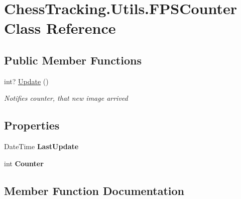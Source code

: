 \hypertarget{class_chess_tracking_1_1_utils_1_1_f_p_s_counter}{}\section{Chess\+Tracking.\+Utils.\+F\+P\+S\+Counter Class Reference}
\label{class_chess_tracking_1_1_utils_1_1_f_p_s_counter}
\subsection*{Public Member Functions}
\begin{DoxyCompactItemize}
\item 
int? \mbox{\hyperlink{class_chess_tracking_1_1_utils_1_1_f_p_s_counter_a8fcd8ace4e8f826f6b7ab54611618ce8}{Update}} ()
\begin{DoxyCompactList}\small\item\em Notifies counter, that new image arrived \end{DoxyCompactList}\end{DoxyCompactItemize}
\subsection*{Properties}
\begin{DoxyCompactItemize}
\item 
\mbox{\label{class_chess_tracking_1_1_utils_1_1_f_p_s_counter_a916eb84ecd60bc2ffd13f792f8f93418}} 
Date\+Time {\bfseries Last\+Update}
\item 
\mbox{\label{class_chess_tracking_1_1_utils_1_1_f_p_s_counter_ac636eb17a4982f8a367ba7af3259df1e}} 
int {\bfseries Counter}
\end{DoxyCompactItemize}


\subsection{Member Function Documentation}
\mbox{\label{class_chess_tracking_1_1_utils_1_1_f_p_s_counter_a8fcd8ace4e8f826f6b7ab54611618ce8}} 
